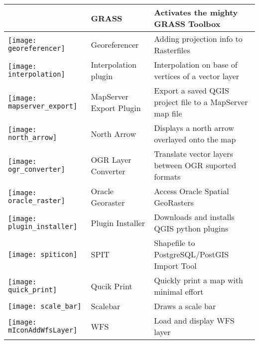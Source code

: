\begin{minipage}{\textwidth}
\begin{table}[H]
\begin{tabular}{|l|l|p{4in}|}
 & GRASS \index{plugin!grass toolbox} & Activates the mighty GRASS Toolbox\\
\hline
\texttt{[image: georeferencer]}
 & Georeferencer \index{plugin!georeferencer} & Adding projection info to Rasterfiles\\
\hline
\texttt{[image: interpolation]}
& Interpolation plugin \index{plugins!Interpolation}& Interpolation on base of vertices of a vector layer\\
\hline
\texttt{[image: mapserver\_export]}
& MapServer Export Plugin \index{plugins!MapServer Export}& Export a saved QGIS project file to a MapServer map file \\
\hline
\texttt{[image: north\_arrow]}
& North Arrow \index{plugins!north arrow}& Displays a north arrow overlayed onto the map\\
\hline
\texttt{[image: ogr\_converter]}
 & OGR Layer Converter \index{plugins!OGR converter} & Translate vector
layers between OGR suported formats\\
\hline
\texttt{[image: oracle\_raster]}
 & Oracle Georaster \index{plugins!georaster}& Access Oracle Spatial GeoRasters\\
\hline
\texttt{[image: plugin\_installer]}
 & Plugin Installer \index{plugins!Plugin Installer} & Downloads and installs QGIS python plugins\\
\hline
\texttt{[image: spiticon]}
 & SPIT \index{plugins!spit}& Shapefile to PostgreSQL/PostGIS Import Tool \\
\hline
\texttt{[image: quick\_print]}
 & Qucik Print \index{plugins!quick print}& Quickly print a map with minimal
effort \\
\hline
\texttt{[image: scale\_bar]}
 & Scalebar \index{plugins!scalebar}& Draws a scale bar\\
\hline
\texttt{[image: mIconAddWfsLayer]}
 & WFS & Load and display WFS layer \\
\hline
\end{tabular}
\end{table}
\end{minipage}

\normalsize

\begin{Tip}\caption{\textsc{Plugins Settings Saved to Project}}
\end{Tip}
